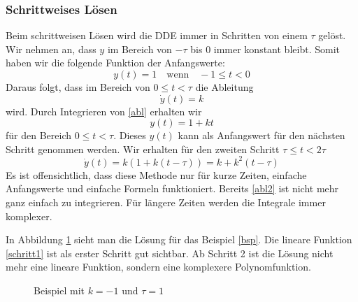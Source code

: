 \subsubsection{Schrittweises Lösen}
Beim schrittweisen Lösen wird die DDE immer in Schritten von einem $\tau$ gelöst.
Wir nehmen an, dass $y$ im Bereich von $-\tau$ bis $0$ immer konstant bleibt.
Somit haben wir die folgende Funktion der Anfangswerte:
\begin{equation}
	y(t)=1 \quad\text{wenn}\quad -1\le t<0
\end{equation}
Daraus folgt, dass im Bereich von $0\le t<\tau$ die Ableitung
\begin{equation}\label{abl}
	\dot{y}(t)=k
\end{equation}
wird. Durch Integrieren von \eqref{abl} erhalten wir
\begin{equation}\label{schritt1}
	y(t)=1+kt
\end{equation}
für den Bereich $0\le t<\tau$. 
Dieses $y(t)$ kann als Anfangswert für den nächsten Schritt genommen werden.
Wir erhalten für den zweiten Schritt  $\tau\le t<2\tau$ 
\begin{equation}\label{abl2}
	\dot{y}(t)=k(1+k(t-\tau))=k+k^2(t-\tau)
\end{equation}
Es ist offensichtlich, dass diese Methode nur für kurze Zeiten, einfache Anfangswerte und einfache Formeln funktioniert. 
Bereits \eqref{abl2} ist nicht mehr ganz einfach zu integrieren. 
Für längere Zeiten werden die Integrale immer komplexer.

In Abbildung \ref{fig:bsp} sieht man die Lösung für das Beispiel \eqref{bsp}. 
Die lineare Funktion \eqref{schritt1} ist als erster Schritt gut sichtbar.
Ab Schritt 2 ist die Lösung nicht mehr eine lineare Funktion, sondern eine komplexere Polynomfunktion. 
\begin{figure}
	\centering
	
	\caption{Beispiel mit $k=-1$ und $\tau=1$}
	\label{fig:bsp}
\end{figure}

